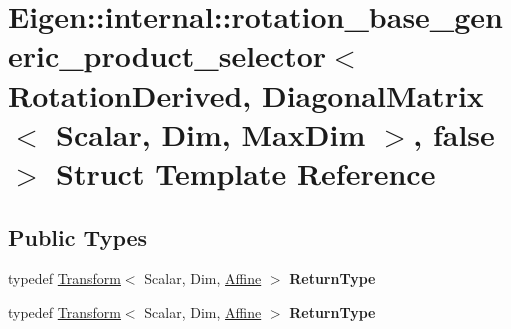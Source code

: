 \hypertarget{struct_eigen_1_1internal_1_1rotation__base__generic__product__selector_3_01_rotation_derived_00_7e855ad9d8f41d04ee2e0f10c5040984}{}\section{Eigen\+:\+:internal\+:\+:rotation\+\_\+base\+\_\+generic\+\_\+product\+\_\+selector$<$ Rotation\+Derived, Diagonal\+Matrix$<$ Scalar, Dim, Max\+Dim $>$, false $>$ Struct Template Reference}
\label{struct_eigen_1_1internal_1_1rotation__base__generic__product__selector_3_01_rotation_derived_00_7e855ad9d8f41d04ee2e0f10c5040984}
\subsection*{Public Types}
\begin{DoxyCompactItemize}
\item 
\mbox{\label{struct_eigen_1_1internal_1_1rotation__base__generic__product__selector_3_01_rotation_derived_00_7e855ad9d8f41d04ee2e0f10c5040984_a85185b2776cd7e5617639cc40a9c5a98}} 
typedef \hyperlink{group___geometry___module_class_eigen_1_1_transform}{Transform}$<$ Scalar, Dim, \hyperlink{group__enums_ggaee59a86102f150923b0cac6d4ff05107a71e768e0581725d919d0b05f4cb83234}{Affine} $>$ {\bfseries Return\+Type}
\item 
\mbox{\label{struct_eigen_1_1internal_1_1rotation__base__generic__product__selector_3_01_rotation_derived_00_7e855ad9d8f41d04ee2e0f10c5040984_a85185b2776cd7e5617639cc40a9c5a98}} 
typedef \hyperlink{group___geometry___module_class_eigen_1_1_transform}{Transform}$<$ Scalar, Dim, \hyperlink{group__enums_ggaee59a86102f150923b0cac6d4ff05107a71e768e0581725d919d0b05f4cb83234}{Affine} $>$ {\bfseries Return\+Type}
\end{DoxyCompactItemize}

